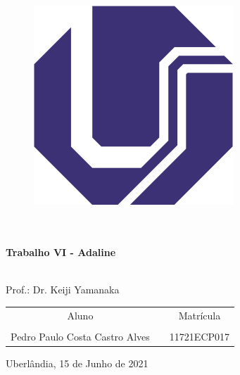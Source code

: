 \documentclass{tcc}
\begin{document}
\pagestyle{empty} %


\begin{center}
\Huge{\bf \thetitle}\\~\\
\begin{figure}[H]
\centering
\includegraphics{imagens/UFU.png}
\end{figure}
\huge{\bf \subtitulo}\\~\\
\Large{\bf Trabalho VI - Adaline}\\~\\

\end{center}

\vspace{2em}

\begin{center}
Prof.: Dr. Keiji Yamanaka

\end{center}

\vspace{2em}
\begin{table}[htb]
\centering
\begin{tabular}{ccc}
Aluno                           &  & Matrícula   \\
                                &  &             \\
Pedro Paulo Costa Castro Alves  &  & 11721ECP017 \\
\end{tabular}
\end{table}


\vspace{5cm}


\begin{center}
Uberlândia, 15 de Junho de 2021
\end{center}
\clearpage
\setcounter{page}{1}



\pagestyle{plain} %

\newpage


\end{document}
